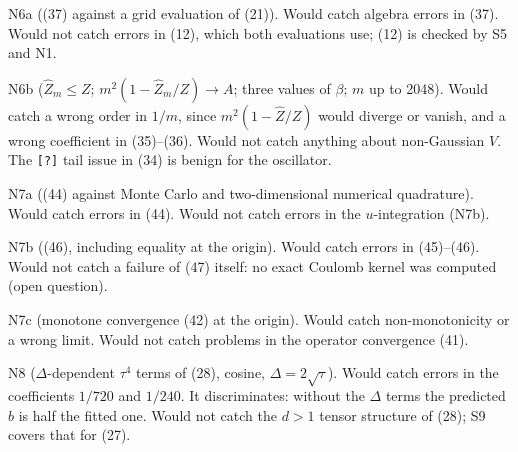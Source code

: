 \documentclass[11pt,a4paper]{article}
\begin{document}
N6a ((37) against a grid evaluation of (21)). Would catch algebra errors in (37). Would not catch errors in (12), which both evaluations use; (12) is checked by S5 and N1.

N6b (\(\hat Z_m\le Z\); \(m^2(1-\hat Z_m/Z)\to A\); three values of \(\beta\); \(m\) up to 2048). Would catch a wrong order in \(1/m\), since \(m^2(1-\hat Z/Z)\) would diverge or vanish, and a wrong coefficient in (35)--(36). Would not catch anything about non-Gaussian \(V\). The \texttt{[?]} tail issue in (34) is benign for the oscillator.

N7a ((44) against Monte Carlo and two-dimensional numerical quadrature). Would catch errors in (44). Would not catch errors in the \(u\)-integration (N7b).

N7b ((46), including equality at the origin). Would catch errors in (45)--(46). Would not catch a failure of (47) itself: no exact Coulomb kernel was computed (open question).

N7c (monotone convergence (42) at the origin). Would catch non-monotonicity or a wrong limit. Would not catch problems in the operator convergence (41).

N8 (\(\Delta\)-dependent \(\tau^4\) terms of (28), cosine, \(\Delta=2\sqrt\tau\)). Would catch errors in the coefficients \(1/720\) and \(1/240\). It discriminates: without the \(\Delta\) terms the predicted \(b\) is half the fitted one. Would not catch the \(d>1\) tensor structure of (28); S9 covers that for (27).
\end{document}
